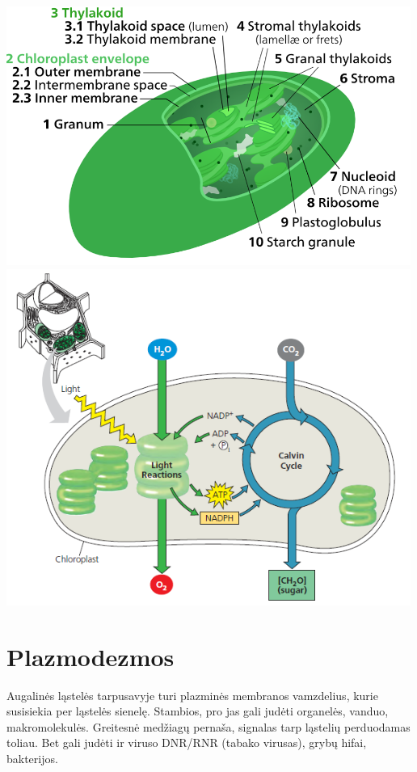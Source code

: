 \documentclass[]{book}
\begin{document}
\includegraphics[width=500px]{static/augalai/chloroplast}
\includegraphics[width=500px]{static/augalai/photosynthesis}

\hypertarget{plazmodezmos}{%
\section{Plazmodezmos}\label{plazmodezmos}}

Augalinės ląstelės tarpusavyje turi plazminės membranos vamzdelius, kurie susisiekia per ląstelės sienelę. Stambios, pro jas gali judėti organelės, vanduo, makromolekulės. Greitesnė medžiagų pernaša, signalas tarp ląstelių perduodamas toliau. Bet gali judėti ir viruso DNR/RNR (tabako virusas), grybų hifai, bakterijos.
\end{document}
